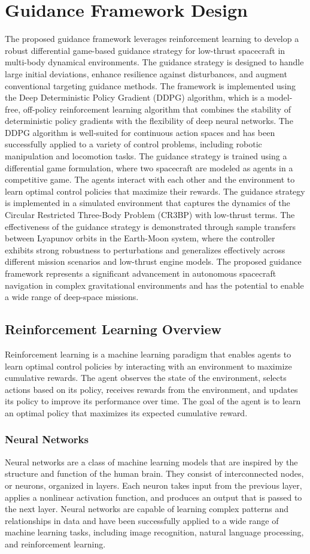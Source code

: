 \documentclass[conference]{IEEEtran}
\begin{document}
\section{Guidance Framework Design}
The proposed guidance framework leverages reinforcement learning to develop a robust differential game-based guidance strategy for low-thrust spacecraft in multi-body dynamical environments. The guidance strategy is designed to handle large initial deviations, enhance resilience against disturbances, and augment conventional targeting guidance methods. The framework is implemented using the Deep Deterministic Policy Gradient (DDPG) algorithm, which is a model-free, off-policy reinforcement learning algorithm that combines the stability of deterministic policy gradients with the flexibility of deep neural networks. The DDPG algorithm is well-suited for continuous action spaces and has been successfully applied to a variety of control problems, including robotic manipulation and locomotion tasks. The guidance strategy is trained using a differential game formulation, where two spacecraft are modeled as agents in a competitive game. The agents interact with each other and the environment to learn optimal control policies that maximize their rewards. The guidance strategy is implemented in a simulated environment that captures the dynamics of the Circular Restricted Three-Body Problem (CR3BP) with low-thrust terms. The effectiveness of the guidance strategy is demonstrated through sample transfers between Lyapunov orbits in the Earth-Moon system, where the controller exhibits strong robustness to perturbations and generalizes effectively across different mission scenarios and low-thrust engine models. The proposed guidance framework represents a significant advancement in autonomous spacecraft navigation in complex gravitational environments and has the potential to enable a wide range of deep-space missions.
\subsection{Reinforcement Learning Overview}
Reinforcement learning is a machine learning paradigm that enables agents to learn optimal control policies by interacting with an environment to maximize cumulative rewards. The agent observes the state of the environment, selects actions based on its policy, receives rewards from the environment, and updates its policy to improve its performance over time. The goal of the agent is to learn an optimal policy that maximizes its expected cumulative reward.
\subsubsection{Neural Networks}
Neural networks are a class of machine learning models that are inspired by the structure and function of the human brain. They consist of interconnected nodes, or neurons, organized in layers. Each neuron takes input from the previous layer, applies a nonlinear activation function, and produces an output that is passed to the next layer. Neural networks are capable of learning complex patterns and relationships in data and have been successfully applied to a wide range of machine learning tasks, including image recognition, natural language processing, and reinforcement learning.
\end{document}
